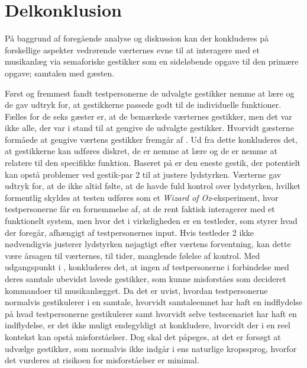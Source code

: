 \section{Delkonklusion}
\label{SocialAcceptDelkonklusion}
%
På baggrund af foregående analyse og diskussion kan der konkluderes på forskellige aspekter vedrørende værternes evne til at interagere med et musikanlæg via semaforiske gestikker som en sideløbende opgave til den primære opgave; samtalen med gæsten.

Først og fremmest fandt testpersonerne de udvalgte gestikker nemme at lære og de gav udtryk for, at gestikkerne passede godt til de individuelle funktioner. Fælles for de seks gæster er, at de bemærkede værternes gestikker, men det var ikke alle, der var i stand til at gengive de udvalgte gestikker. Hvorvidt gæsterne formåede at gengive værtens gestikker fremgår af . Ud fra dette konkluderes det, at gestikkerne kan udføres diskret, de er nemme at lære og de er nemme at relatere til den specifikke funktion. Baseret på  er den eneste gestik, der potentielt kan opstå problemer ved gestik-par 2 til at justere lydstyrken. Værterne gav udtryk for, at de ikke altid følte, at de havde fuld kontrol over lydstyrken, hvilket formentlig skyldes at testen udføres som et \textit{Wizard of Oz}-eksperiment, hvor testpersonerne får en fornemmelse af, at de rent faktisk interagerer med et funktionelt system, men hvor det i virkeligheden er en testleder, som styrer hvad der foregår, afhængigt af testpersonernes input. Hvis testleder 2 ikke nødvendigvis justerer lydstyrken nøjagtigt efter værtens forventning, kan dette være årsagen til værternes, til tider, manglende følelse af kontrol.\blankline
%    
Med udgangspunkt i , konkluderes det, at ingen af testpersonerne i forbindelse med deres samtale ubevidst lavede gestikker, som kunne misforståes som decideret kommandoer til musikanlægget. Da det er uvist, hvordan testpersonerne normalvis gestikulerer i en samtale, hvorvidt samtaleemnet har haft en indflydelse på hvad testpersonerne gestikulerer samt hvorvidt selve testscenariet har haft en indflydelse, er det ikke muligt endegyldigt at konkludere, hvorvidt der i en reel kontekst kan opstå misforståelser. Dog skal det påpeges, at det er forsøgt at udvælge gestikker, som normalvis ikke indgår i ens naturlige kropssprog, hvorfor det vurderes at risikoen for misforståelser er minimal.\blankline   
%
